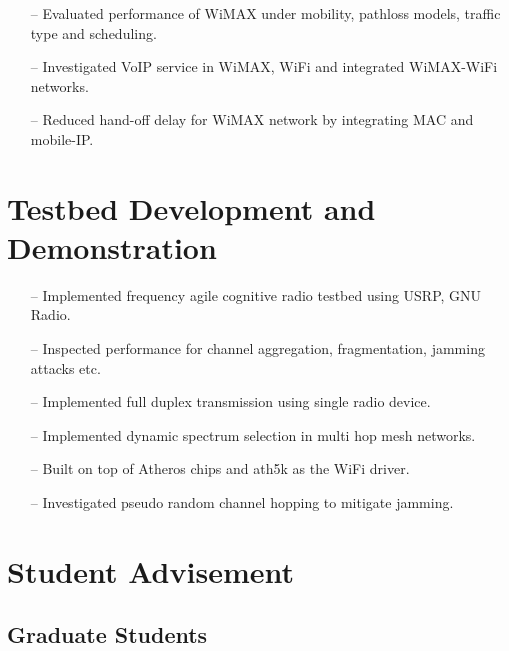 \documentclass[10pt,times]{article}
\begin{document}
  {
  \begin{itemize}
    \item[--] Evaluated performance of WiMAX under mobility, pathloss models, traffic type and scheduling.
    \item[--] Investigated VoIP service in WiMAX, WiFi and integrated WiMAX-WiFi networks.
    \item[--] Reduced hand-off delay for WiMAX network  by integrating  MAC and mobile-IP.
  \end{itemize}
  }


\section{Testbed Development and Demonstration}
  {
  \begin{itemize}
    \item[--] Implemented frequency agile cognitive radio testbed using USRP, GNU Radio.
    \item[--] Inspected performance for channel aggregation, fragmentation, jamming attacks etc.
    \item[--] Implemented full duplex transmission using single radio device.
    \item[--] Implemented dynamic spectrum selection in multi hop mesh networks.
  \end{itemize}
  }

  {
  \begin{itemize}
    \item[--] Built on top of Atheros chips and ath5k as the WiFi driver.
    \item[--] Investigated pseudo random channel hopping to mitigate jamming.
  \end{itemize}
  }




\section{Student Advisement}
\subsection{Graduate Students}
\end{document}
